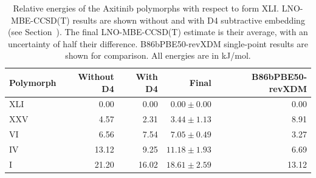 \begin{table}[h]
\centering

\caption{\label{tab:axitinib_polymorph_relative_energies}Relative energies of the Axitinib polymorphs with respect to form XLI. LNO-MBE-CCSD(T) results are shown without and with D4 subtractive embedding (see Section~). The final LNO-MBE-CCSD(T) estimate is their average, with an uncertainty of half their difference. B86bPBE50-revXDM single-point results are shown for comparison. All energies are in kJ/mol.}
\begin{tabular}{lrrrr}
\toprule
Polymorph & Without D4 & With D4 & Final & B86bPBE50-revXDM \\ 
\midrule
XLI & 0.00 & 0.00 & $0.00 \pm 0.00$ & 0.00 \\
XXV & 4.57 & 2.31 & $3.44 \pm 1.13$ & 8.91 \\
VI & 6.56 & 7.54 & $7.05 \pm 0.49$ & 3.27 \\
IV & 13.12 & 9.25 & $11.18 \pm 1.93$ & 6.69 \\
I & 21.20 & 16.02 & $18.61 \pm 2.59$ & 13.12 \\
\bottomrule
\end{tabular}

\end{table}